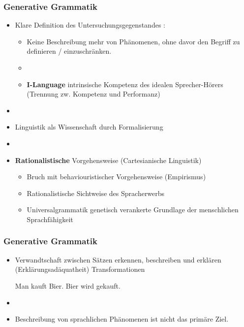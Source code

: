 \begin{frame}
\frametitle{Generative Grammatik}

\begin{itemize}
	\item Klare Definition des Untersuchungsgegenstandes :
	\begin{itemize}
		\item Keine Beschreibung mehr von  Phänomenen, ohne davor den Begriff  zu definieren / einzuschränken.
		\item[]
		\item \textbf{I-Language} \ras intrinsische Kompetenz des idealen Sprecher-Hörers (Trennung zw. Kompetenz und Performanz)
	\end{itemize}
	\item[]
	\item Linguistik als Wissenschaft \ras durch Formalisierung
	\item[]
	\item \textbf{Rationalistische} Vorgehensweise (Cartesianische Linguistik)
	\begin{itemize}
		\item Bruch mit behaviouristischer Vorgehensweise (Empirismus)
		\item Rationalistische Sichtweise des Spracherwerbs
		\item Universalgrammatik \ras genetisch verankerte Grundlage der menschlichen Sprachfähigkeit
	\end{itemize}
\end{itemize}

\nocite{Fries&MyP16d}

\end{frame}


\begin{frame}
\frametitle{Generative Grammatik}

\begin{itemize}
	\item Verwandtschaft zwischen Sätzen erkennen, beschreiben und erklären (Erklärungsadäquatheit) \ras Transformationen
	
	\eal 
	\ex Man kauft Bier.
	\ex Bier wird gekauft.
	\zl
	
	\item[]	
	\item Beschreibung von sprachlichen Phänomenen ist nicht das primäre Ziel.
\end{itemize}

\end{frame}


